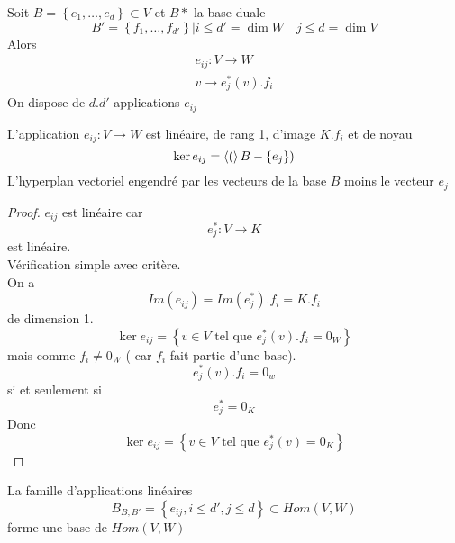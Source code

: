 \documentclass[../main.tex]{subfiles}
\begin{document}
Soit $B = \left\{ e_1, \ldots, e_d \right\} \subset V $ et $B*$ la base duale
\[ 
B' = \left\{ f_1, \ldots, f_{ d' } \right\} | i \leq d' = \dim W \quad j \leq d = \dim V
\]
Alors
\begin{align*}
e_{ij} : V \to W\\
v \to e_j^{*}( v) . f_i
\end{align*}
On dispose de $d . d'$ applications $e_{ij} $ 
\begin{lemma}
L'application $e_{ij} : V \to W$ est linéaire, de rang 1, d'image $K. f_i$ et de noyau
\[ 
	\ker e_{ij} = \left\langle(\right\rangle B - \left\{ e_j \right\} ) 
\]
L'hyperplan vectoriel engendré par les vecteurs de la base $B$ moins le vecteur $e_j$

\end{lemma}
\begin{proof}
$e_{ij} $ est linéaire car
\[ 
e_j^{*}: V \to K
\]
est linéaire.\\
Vérification simple avec critère.\\

On a 
\[ 
	Im( e_{ij} ) = Im( e_j^{*}) .f_i = K.f_i
\]
de dimension 1.\\
\[ 
	\ker e_{ij}  = \left\{ v \in V \text{ tel que } e_j^{*}( v) .f_i = 0_W \right\} 
\]
mais comme $f_i \neq 0_W$ ( car $f_i$ fait partie d'une base).
\[ 
	e_j^{*}( v) .f_i = 0_w
\]
si et seulement si
\[ 
e_j ^{*}= 0_K
\]
Donc 
\[ 
	\ker e_{ij} = \left\{ v \in V \text{ tel que } e_j^{*}( v) = 0_K \right\} 
\]


\end{proof}
\begin{thm}
La famille d'applications linéaires
\[ 
	B_{B,B'} = \left\{ e_{ij}, i \leq d', j \leq d \right\} \subset Hom( V,W) 
\]
forme une base de $Hom( V,W) $
\end{thm}
\end{document}
